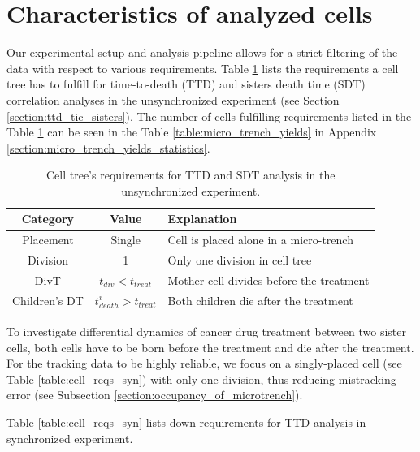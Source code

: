 \documentclass[pdftex,12pt,a4paper]{report}
\begin{document}
\section{Characteristics of analyzed cells}
\label{section:characteristics_of_analyzed_cells}

Our experimental setup and analysis pipeline allows for a strict filtering of the data with respect to various requirements. Table \ref{table:cell_reqs_main} lists the requirements a cell tree has to fulfill for time-to-death (TTD) and sisters death time (SDT) correlation analyses in the unsynchronized experiment (see Section \ref{section:ttd_tic_sisters}). The number of cells fulfilling requirements listed in the Table \ref{table:cell_reqs_main} can be seen in the Table \ref{table:micro_trench_yields} in Appendix \ref{section:micro_trench_yields_statistics}.

\begin{table}[H]
\centering
\begin{tabular}{ c | c | l }
\hline
Category & Value & Explanation \\
\hline\hline
Placement & Single & Cell is placed alone in a micro-trench \\
Division  & 1 & Only one division in cell tree \\
DivT & $t_{div} < t_{treat}$ & Mother cell divides before the treatment\\
Children's DT & $t^i_{death} > t_{treat}$  & Both children die after the treatment\\
\hline
\end{tabular}
\caption[Requirements for TTD and SDT analysis in the unsynchronized experiment]{Cell tree's requirements for TTD and SDT analysis in the unsynchronized experiment.}
\label{table:cell_reqs_main}
\end{table}

To investigate differential dynamics of cancer drug treatment between two sister cells, both cells have to be born before the treatment and die after the treatment. For the tracking data to be highly reliable, we focus on a singly-placed cell (see Table \ref{table:cell_reqs_syn}) with only one division, thus reducing mistracking error (see Subsection \ref{section:occupancy_of_microtrench}).

Table \ref{table:cell_reqs_syn} lists down requirements for TTD analysis in synchronized experiment.

\end{document}
